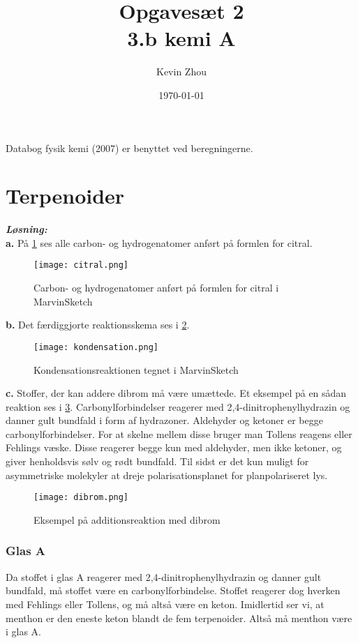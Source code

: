 \documentclass{report}
\title{Opgavesæt 2\\
{\Large \textbf{3.b kemi A}}}
\author{Kevin Zhou}
\date{\today}
\newcommand{\sol}{\setlength{\parindent}{0cm}\textbf{\textit{Løsning:}}\setlength{\parindent}{1cm}}
\begin{document}
\maketitle
\begin{note}
  Databog fysik kemi (2007) er benyttet ved beregningerne.
\end{note}
\section*{Terpenoider}
\sol \\
\textbf{a.}
På \cref{fig:citral} ses alle carbon- og hydrogenatomer anført på formlen for citral.
\begin{figure}[H]
\begin{center}
  \texttt{[image: citral.png]}
\end{center}
\caption{Carbon- og hydrogenatomer anført på formlen for citral i MarvinSketch}
\label{fig:citral}
\end{figure}
\noindent \textbf{b.}
Det færdiggjorte reaktionsskema ses i \cref{fig:kondensation}.
\begin{figure}[H]
\begin{center}
  \texttt{[image: kondensation.png]}
\end{center}
\caption{Kondensationsreaktionen tegnet i MarvinSketch}
\label{fig:kondensation}
\end{figure}
\noindent \textbf{c.}
Stoffer, der kan addere dibrom må være umættede.
Et eksempel på en sådan reaktion ses i \cref{fig:dibrom}.
Carbonylforbindelser reagerer med 2,4-dinitrophenylhydrazin og danner gult bundfald i form af hydrazoner.
Aldehyder og ketoner er begge carbonylforbindelser.
For at skelne mellem disse bruger man Tollens reagens eller Fehlings væske.
Disse reagerer begge kun med aldehyder, men ikke ketoner, og giver henholdsvis sølv og rødt bundfald.
Til sidst er det kun muligt for asymmetriske molekyler at dreje polarisationsplanet for planpolariseret lys.
\begin{figure}[H]
\begin{center}
  \texttt{[image: dibrom.png]}
\end{center}
\caption{Eksempel på additionsreaktion med dibrom}
\label{fig:dibrom}
\end{figure}
\subsubsection{Glas A}
Da stoffet i glas A reagerer med 2,4-dinitrophenylhydrazin og danner gult bundfald, må stoffet være en carbonylforbindelse.
Stoffet reagerer dog hverken med Fehlings eller Tollens, og må altså være en keton.
Imidlertid ser vi, at menthon er den eneste keton blandt de fem terpenoider.
Altså må menthon være i glas A.
\end{document}
